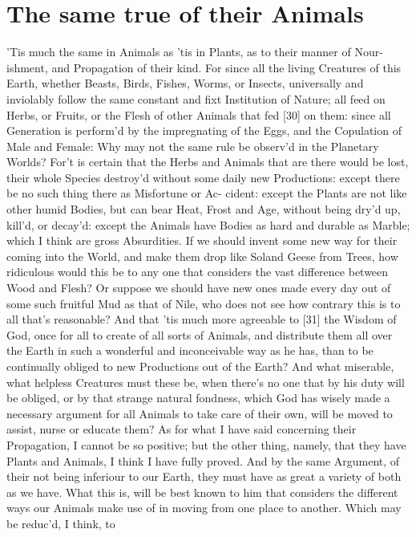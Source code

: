 \documentclass[letterpaper]{book}
\begin{document}
\section{The same true of their Animals}

'Tis much the same in Animals as 'tis in Plants, as to their manner of Nour-
ishment, and Propagation of their kind. For since all the living Creatures
of this Earth, whether Beasts, Birds, Fishes, Worms, or Insects, universally
and inviolably follow the same constant and fixt Institution of Nature; all
feed on Herbs, or Fruits, or the Flesh of other Animals that fed [30] on
them: since all Generation is perform'd by the impregnating of the Eggs, and
the Copulation of Male and Female: Why may not the same rule be observ'd in
the Planetary Worlds? For't is certain that the Herbs and Animals that are
there would be lost, their whole Species destroy'd without some daily new
Productions: except there be no such thing there as Misfortune or Ac-
cident: except the Plants are not like other humid Bodies, but can bear
Heat, Frost and Age, without being dry'd up, kill'd, or decay'd: except the
Animals have Bodies as hard and durable as Marble; which I think are gross
Absurdities. If we should invent some new way for their coming into the
World, and make them drop like Soland Geese from Trees, how ridiculous would
this be to any one that considers the vast difference between Wood and
Flesh? Or suppose we should have new ones made every day out of some such
fruitful Mud as that of Nile, who does not see how contrary this is to all
that's reasonable? And that 'tis much more agreeable to [31] the Wisdom of
God, once for all to create of all sorts of Animals, and distribute them all
over the Earth in such a wonderful and inconceivable way as he has, than to
be continually obliged to new Productions out of the Earth?  And what
miserable, what helpless Creatures must these be, when there's no one that
by his duty will be obliged, or by that strange natural fondness, which God
has wisely made a necessary argument for all Animals to take care of their
own, will be moved to assist, nurse or educate them?  As for what I have
said concerning their Propagation, I cannot be so positive; but the other
thing, namely, that they have Plants and Animals, I think I have fully
proved. And by the same Argument, of their not being inferiour to our Earth,
they must have as great a variety of both as we have. What this is, will be
best known to him that considers the different ways our Animals make use of
in moving from one place to another. Which may be reduc'd, I think, to
\end{document}
